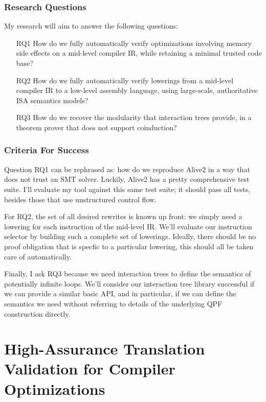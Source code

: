 \documentclass[a4paper]{scrartcl}
\begin{document}
\subsubsection*{Research Questions}

My research will aim to answer the following questions:
\begin{enumerate}
  \item[\textsc{RQ1}]\label{research-question-1}
    How do we fully automatically verify optimizations involving memory side effects on a mid-level compiler IR, 
    while retaining a minimal trusted code base?

  \item[\textsc{RQ2}]
    How do we fully automatically verify lowerings from a mid-level compiler IR
  to a low-level assembly language, using large-scale, authoritative ISA semantics models?

  \item[\textsc{RQ3}] 
    How do we recover the modularity that interaction trees provide,
      in a theorem prover that does not support coinduction?
\end{enumerate}

\subsubsection*{Criteria For Success}

Question \textsc{RQ1} can be rephrased as: 
how do we reproduce Alive2 in a way that does not trust an SMT solver. 
Luckily, Alive2 has a pretty comprehensive test suite.
I'll evaluate my tool against this same test suite; it should pass all tests,
besides those that use unstructured control flow.

For \textsc{RQ2}, the set of all desired rewrites is known up front: we simply 
need a lowering for each instruction of the mid-level IR.
We'll evaluate our instruction selector by building such a complete set of lowerings.
Ideally, there should be no proof obligation that is specfic to a particular lowering,
this should all be taken care of automatically.

Finally, I ask \textsc{RQ3} because we need interaction trees to define the semantics
of potentially infinite loops. 
We'll consider our interaction tree library successful if
we can provide a similar basic API, and in particular, if we can define the 
semantics we need without referring to details of the underlying QPF construction directly.


\section{High-Assurance Translation Validation for Compiler
Optimizations}\label{high-assurance-translation-validation-for-compiler-optimizations}
\end{document}
